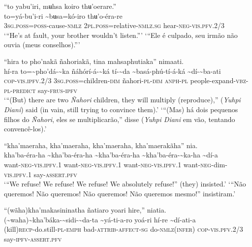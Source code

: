 \documentclass[output=paper,
modfonts,nonflat
]{langsci/langscibook}
\begin{document}
\ea “to yabu'iri, mʉhsa koiro thʉ'oerare.” \\[.3em]
\gll to=yá-bu'i-ri	{\textasciitilde}bʉsa=kó-iro	thʉ'o-éra-re \\
     3\textsc{sg.poss=poss}-cause\textsc{-nmlz}	2\textsc{pl.poss}=relative\textsc{-nmlz.sg}	hear\textsc{-neg-vis.pfv.}2/3\\
\glt ‘“He's at fault, your brother wouldn't listen.”’
\glt ‘“Ele é culpado, seu irmão não ouvia (meus conselhos).”’
\z 

\ea “hira to pho'nakã ñahoriakã, tina mahsaphutiaka” nimaati. \\[.3em]
\gll hí-ra	to={\textasciitilde}pho'dá-{\textasciitilde}ka	ñáhórí-á-{\textasciitilde}ká	tí-{\textasciitilde}da {\textasciitilde}basá-phú-tí-á-ká	{\textasciitilde}dí-{\textasciitilde}ba-ati\\
     \textsc{cop-vis.ipfv.}2/3	3\textsc{sg.poss}=children-\textsc{dim}	ñahori\textsc{-pl-dim}	\textsc{anph-pl} people-expand-\textsc{vbz-pl-predict}	say-\textsc{frus-ipfv}\\
\glt ‘“(But) there are two \textit{Ñahori} children, they will multiply (reproduce),” (\textit{Yuhpi Diani}) said (in vain, still trying to convince them).’
\glt ‘“(Mas) há dois pequenos filhos do \textit{Ñahori}, eles se multiplicarão,” disse (\textit{Yuhpi Diani} em vão, tentando convencê-los).’
\z 

\ea “kha'maeraha, kha'maeraha, kha'maeraha, kha'maerakãha” nia.\\[.3em]
\gll {\textasciitilde}kha'ba-éra-ha	{\textasciitilde}kha'ba-éra-ha	{\textasciitilde}kha'ba-éra-ha {\textasciitilde}kha'ba-éra-{\textasciitilde}ka-ha	{\textasciitilde}dí-a\\
     want\textsc{-neg-vis.ipfv.}1	want\textsc{-neg-vis.ipfv.}1	want\textsc{-neg-vis.ipfv.}1 want\textsc{-neg}-dim-\textsc{vis.ipfv.}1	say-\textsc{assert.pfv}\\
\glt ‘“We refuse! We refuse! We refuse! We absolutely refuse!” (they) insisted.’
\glt ‘“Não queremos! Não queremos! Não queremos! Não queremos mesmo!” insistiram.’
\z

\ea “(wãha)kha'makasininatha ñatiaro yoari hire,” niatia. \\[.3em]
\gll ({\textasciitilde}waha){\textasciitilde}kha'báka-{\textasciitilde}sidi-{\textasciitilde}da-ta{\footnotemark}	{\textasciitilde}yá-ti-a-ro	yoá-ri	hí-re	{\textasciitilde}dí-ati-a \\
     (kill)\textsc{recp}-do.still\textsc{-pl-emph}	bad-\textsc{attrib-affect-sg}	do\textsc{-nmlz(infer) }	\textsc{cop-vis.pfv.}2/3	say-\textsc{ipfv-assert.pfv}\\
     
\end{document}
